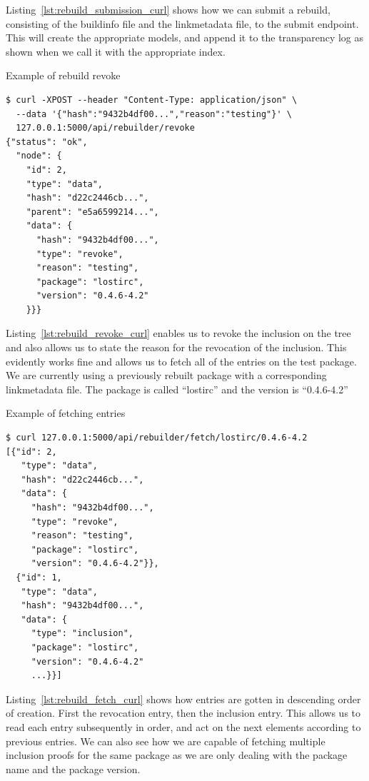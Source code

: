 \documentclass[../Main/thesis.tex]{subfiles}
\begin{document}
Listing~\ref{lst:rebuild_submission_curl} shows how we can submit a rebuild,
consisting of the buildinfo file and the linkmetadata file, to the submit
endpoint. This will create the appropriate models, and append it to the
transparency log as shown when we call it with the appropriate index.

\begin{listing}[H]
\caption{Example of rebuild revoke}
\label{lst:rebuild_revoke_curl}
\begin{verbatim}
$ curl -XPOST --header "Content-Type: application/json" \
  --data '{"hash":"9432b4df00...","reason":"testing"}' \
  127.0.0.1:5000/api/rebuilder/revoke
{"status": "ok",
  "node": {
    "id": 2,
    "type": "data",
    "hash": "d22c2446cb...",
    "parent": "e5a6599214...",
    "data": {
      "hash": "9432b4df00...",
      "type": "revoke",
      "reason": "testing",
      "package": "lostirc",
      "version": "0.4.6-4.2"
    }}}
\end{verbatim}
\end{listing}

Listing~\ref{lst:rebuild_revoke_curl} enables us to revoke the inclusion on the
tree and also allows us to state the reason for the revocation of the inclusion.
This evidently works fine and allows us to fetch all of the entries on the test
package. We are currently using a previously rebuilt package with a corresponding
linkmetadata file. The package is called ``lostirc'' and the version is
``0.4.6-4.2''

\begin{listing}[H]
\caption{Example of fetching entries}
\label{lst:rebuild_fetch_curl}
\begin{verbatim}
$ curl 127.0.0.1:5000/api/rebuilder/fetch/lostirc/0.4.6-4.2
[{"id": 2,
   "type": "data",
   "hash": "d22c2446cb...",
   "data": {
     "hash": "9432b4df00...",
     "type": "revoke",
     "reason": "testing",
     "package": "lostirc",
     "version": "0.4.6-4.2"}},
  {"id": 1,
   "type": "data",
   "hash": "9432b4df00...",
   "data": {
     "type": "inclusion",
     "package": "lostirc",
     "version": "0.4.6-4.2"
     ...}}]
\end{verbatim}
\end{listing}

Listing~\ref{lst:rebuild_fetch_curl} shows how entries are gotten in descending
order of creation. First the revocation entry, then the inclusion entry. This
allows us to read each entry subsequently in order, and act on the next elements
according to previous entries. We can also see how we are capable of fetching
multiple inclusion proofs for the same package as we are only dealing with the
package name and the package version.
\end{document}

